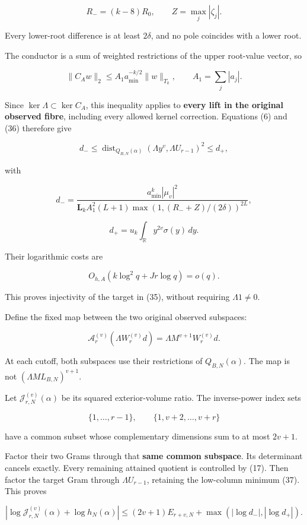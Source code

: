 \documentclass[11pt]{article}
\begin{document}
\[
R_-=(k-8)R_0,\qquad Z=\max_j|\zeta_j|.
\]

Every lower-root difference is at least \(2\delta\), and no pole coincides with a lower root.

The conductor is a sum of weighted restrictions of the upper root-value vector, so

\[
\|C_Aw\|_2
\le A_1a_{\min}^{-k/2}\|w\|_{T_k},
\qquad A_1=\sum_j|a_j|.
\]

Since \(\ker\Lambda\subset\ker C_A\), this inequality applies to \textbf{every lift in the original observed fibre}, including every allowed kernel correction. Equations (6) and (36) therefore give

\[
\boxed{
d_-\le
\operatorname{dist}_{Q_{B,N}(\alpha)}
(\Lambda y^v,\Lambda U_{r-1})^2
\le d_+,
}
\tag{37}
\]

with

\[
d_-=
\frac{a_{\min}^k|\mu_v|^2}
{\mathbf L_kA_1^2(L+1)
 \max(1,(R_-+Z)/(2\delta))^{2L}},
\]

\[
d_+=u_k\int_{\mathbb R}y^{2v}\sigma(y)\,dy.
\]

Their logarithmic costs are

\[
O_{h,A}(k\log^2q+Jr\log q)=o(q).
\]

This proves injectivity of the target in (35), without requiring \(\Lambda1\ne0\).

Define the fixed map between the two original observed subspaces:

\[
\boxed{
\mathscr A_r^{(v)}(\Lambda W_r^{(v)}d)
=
\Lambda M^{v+1}W_r^{(v)}d.
}
\tag{38}
\]

At each cutoff, both subspaces use their restrictions of \(Q_{B,N}(\alpha)\). The map is not \((\Lambda ML_{B,N})^{v+1}\).

Let \(\mathscr J_{r,N}^{(v)}(\alpha)\) be its squared exterior-volume ratio. The inverse-power index sets

\[
\{1,\ldots,r-1\},
\qquad
\{1,v+2,\ldots,v+r\}
\]

have a common subset whose complementary dimensions sum to at most \(2v+1\).

Factor their two Grams through that \textbf{same common subspace}. Its determinant cancels exactly. Every remaining attained quotient is controlled by (17). Then factor the target Gram through \(\Lambda U_{r-1}\), retaining the low-column minimum (37). This proves

\[
\boxed{
\left|
\log\mathscr J_{r,N}^{(v)}(\alpha)+\log h_N(\alpha)
\right|
\le
(2v+1)E_{r+v,N}
+\max(|\log d_-|,|\log d_+|).
}
\tag{39}
\]
\end{document}

